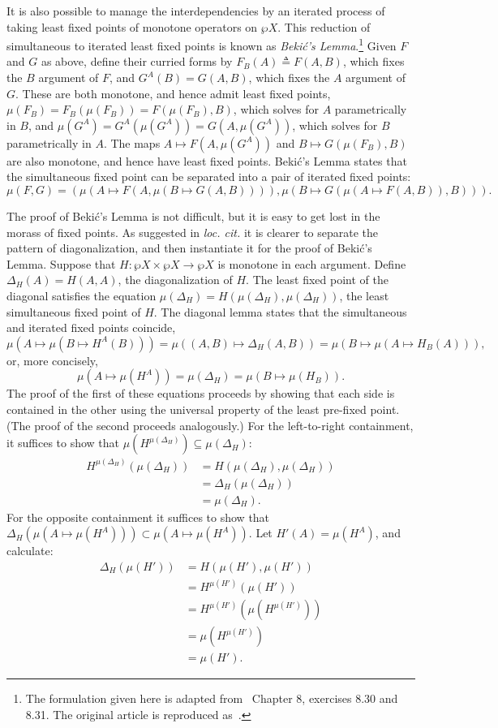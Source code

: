 \documentclass[11pt,twoside]{article}
\newcommand{\eqdef}{\mathrel{\triangleq}}
\begin{document}
It is also possible to manage the interdependencies by an iterated process of taking least
fixed points of monotone operators on $\wp{X}$.  This reduction of simultaneous to iterated
least fixed points is known as \emph{Beki\'{c}'s Lemma}.\footnote{The formulation given here
  is adapted from~\citet{davey-priestley} Chapter 8, exercises 8.30 and 8.31.  The
  original article is reproduced as~\citet{bekic84}.}  Given $F$
and $G$ as above, define their curried forms by $F_{B}(A)\eqdef{} F(A,B)$, which fixes the
$B$ argument of $F$, and $G^{A}(B)=G(A,B)$, which fixes the $A$ argument of $G$.  These
are both monotone, and hence admit least fixed points,
$\mu(F_{B})=F_{B}(\mu(F_{B}))=F(\mu(F_{B}),B)$, which solves for $A$ parametrically in
$B$, and $\mu(G^{A})=G^{A}(\mu(G^{A}))=G(A,\mu(G^{A}))$, which solves for $B$ parametrically in
$A$.  The maps $A\mapsto F(A,\mu(G^{A}))$ and $B\mapsto G(\mu(F_{B}),B)$ are also monotone, and hence have
least fixed points.  Beki\'{c}'s Lemma states that the simultaneous fixed point can be
separated into a pair of iterated fixed points:
$$\mu(F,G) = (\mu(A\mapsto F(A,\mu(B\mapsto G(A,B)))),\mu(B\mapsto G(\mu(A\mapsto F(A,B)),B))).$$

The proof of Beki\'{c}'s Lemma is not difficult, but it is easy to get lost in the morass of
fixed points.  As suggested in \textit{loc. cit.} it is clearer to separate the pattern of
diagonalization, and then instantiate it for the proof of Beki\'{c}'s Lemma.  Suppose that
$H:\wp{X}\times\wp{X}\to\wp{X}$ is monotone in each argument.  Define
$\Delta_{H}(A)=H(A,A)$, the diagonalization of $H$.  The least fixed point of the diagonal
satisfies the equation $\mu(\Delta_{H})=H(\mu(\Delta_{H}),\mu(\Delta_{H}))$, the least simultaneous fixed point of
$H$.  The diagonal lemma states that the simultaneous and iterated fixed points coincide,
$$\mu(A\mapsto\mu(B\mapsto H^{A}(B)))=\mu((A,B)\mapsto \Delta_{H}(A,B))=\mu(B\mapsto\mu(A\mapsto H_{B}(A))),$$
or, more concisely,
$$\mu(A\mapsto \mu(H^{A}))=\mu(\Delta_{H})=\mu(B\mapsto\mu(H_{B})).$$
The proof of the first of these equations proceeds by showing that each side is contained
in the other using the universal property of the least pre-fixed point.  (The proof of the
second proceeds analogously.)  For the left-to-right containment, it suffices to show that
$\mu(H^{\mu(\Delta_{H})})\subseteq\mu(\Delta_{H})$:
\begin{align*}
  H^{\mu(\Delta_{H})}(\mu(\Delta_{H}))
  & = H(\mu(\Delta_{H}),\mu(\Delta_{H})) \\
  & = \Delta_{H}(\mu(\Delta_{H})) \\
  & = \mu(\Delta_{H}).
\end{align*}
For the opposite containment it suffices to show that
$\Delta_{H}(\mu(A\mapsto\mu(H^{A})))\subset \mu(A\mapsto\mu(H^{A}))$.  Let $H'(A)=\mu(H^{A})$, and calculate:
\begin{align*}
  \Delta_{H}(\mu(H'))
  & = H(\mu(H'),\mu(H')) \\
  & = H^{\mu(H')}(\mu(H')) \\
  & = H^{\mu(H')}(\mu(H^{\mu(H')})) \\
  & = \mu(H^{\mu(H')}) \\
  & = \mu(H').
\end{align*}
\end{document}
